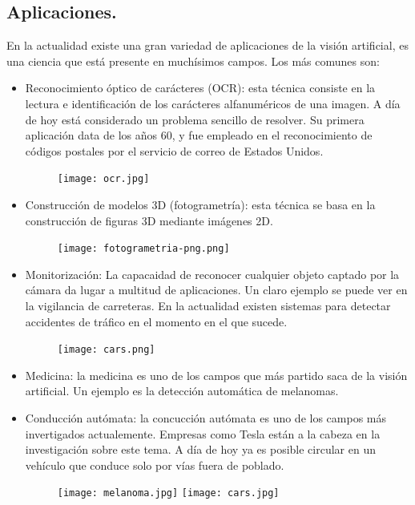 \documentclass[a4paper,10pt]{article}
\begin{document}
\subsection{Aplicaciones.}
En la actualidad existe una gran variedad de aplicaciones de la visión artificial, es una ciencia que está presente en muchísimos campos. Los más comunes son:
\begin{itemize}
\item Reconocimiento óptico de carácteres (OCR): esta técnica consiste en la lectura e identificación de los carácteres alfanuméricos de una imagen. A día de hoy está considerado un problema sencillo de resolver. Su primera aplicación data de los años 60, y fue empleado en el reconocimiento de códigos postales por el servicio de correo de Estados Unidos.
\begin{figure}[H]
\centering
\texttt{[image: ocr.jpg]}
\end{figure}
\item Construcción de modelos 3D (fotogrametría): esta técnica se basa en la construcción de figuras 3D mediante imágenes 2D.
\begin{figure}[H]
\centering
\texttt{[image: fotogrametria-png.png]}
\end{figure}
\item Monitorización: La capacaidad de reconocer cualquier objeto captado por la cámara da lugar a multitud de aplicaciones. Un claro ejemplo se puede ver en la vigilancia de carreteras. En la actualidad existen sistemas para detectar accidentes de tráfico en el momento en el que sucede.
\begin{figure}[H]
\centering
\texttt{[image: cars.png]}
\end{figure}
\item Medicina: la medicina es uno de los campos que más partido saca de la visión artificial. Un ejemplo es la detección automática de melanomas.
\item Conducción autómata: la concucción autómata es uno de los campos más invertigados actualemente. Empresas como Tesla están a la cabeza en la investigación sobre este tema. A día de hoy ya es posible circular en un vehículo que conduce solo por vías fuera de poblado.
\begin{figure}[H]
\centering
\texttt{[image: melanoma.jpg]}\hfill
\texttt{[image: cars.jpg]}
\end{figure}
\end{itemize}
\end{document}
